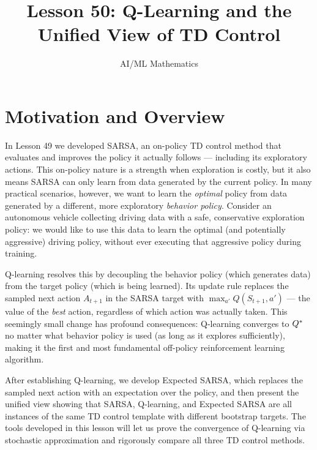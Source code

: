 \documentclass[11pt,a4paper]{article}
\title{Lesson 50: Q-Learning and the Unified View of TD Control}
\author{AI/ML Mathematics}
\date{}
\begin{document}
\maketitle
\tableofcontents
\newpage

\section{Motivation and Overview}
\label{sec:motivation}

In Lesson 49 we developed SARSA, an on-policy TD control method that
evaluates and improves the policy it actually follows --- including
its exploratory actions. This on-policy nature is a strength when
exploration is costly, but it also means SARSA can only learn from
data generated by the current policy. In many practical scenarios,
however, we want to learn the \emph{optimal} policy from data
generated by a different, more exploratory \emph{behavior policy}.
Consider an autonomous vehicle collecting driving data with a safe,
conservative exploration policy: we would like to use this data to
learn the optimal (and potentially aggressive) driving policy,
without ever executing that aggressive policy during training.

Q-learning resolves this by decoupling the behavior policy
(which generates data) from the target policy (which is being
learned). Its update rule replaces the sampled next action
$A_{t+1}$ in the SARSA target with $\max_{a'} Q(S_{t+1}, a')$ ---
the value of the \emph{best} action, regardless of which action was
actually taken. This seemingly small change has profound consequences:
Q-learning converges to $Q^*$ no matter what behavior policy
is used (as long as it explores sufficiently), making it the first
and most fundamental off-policy reinforcement learning algorithm.

After establishing Q-learning, we develop Expected SARSA, which
replaces the sampled next action with an expectation over the
policy, and then present the unified view showing that SARSA,
Q-learning, and Expected SARSA are all instances of the same TD
control template with different bootstrap targets. The tools
developed in this lesson will let us prove the convergence of
Q-learning via stochastic approximation and rigorously compare
all three TD control methods.
\end{document}
